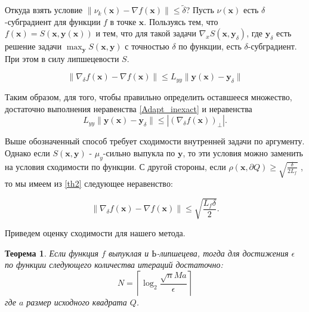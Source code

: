 \documentclass[12pt]{article}
\newtheorem{theorem}{Теорема}[section]
\begin{document}
Откуда взять условие $\|\nu_k(\textbf{x})- \nabla f(\textbf{x})\|\leq \tilde{\delta}$? Пусть $\nu(\textbf{x})$ есть $\delta$-субградиент для функции $f$ в точке $\textbf{x}$. Пользуясь тем, что $f(\textbf{x})=S(\textbf{x}, \textbf{y}(\textbf{x}))$ и тем, что для такой задачи $\nabla_x S(\textbf{x}, \textbf{y}_\delta)$, где $\textbf{y}_\delta$ есть решение задачи $\max_{\textbf{y}}S(\textbf{x}, \textbf{y})$  с точностью $\delta$ по функции, есть $\delta$-субградиент. При этом в силу липшецевости $S$.

$$\|\nabla_\delta f(\textbf{x})- \nabla f(\textbf{x})\|\leq L_{yy} \|\textbf{y}(\textbf{x}) - \textbf{y}_\delta\|$$

Таким образом, для того, чтобы правильно определить оставшееся множество, достаточно выполнения неравенства \ref{Adapt_inexact} и неравенства 
\begin{equation}
    L_{yy} \|\textbf{y}(\textbf{x}) - \textbf{y}_\delta\|\leq |\left(\nabla_\delta f(\textbf{x})\right)_\perp|.
\end{equation}

Выше обозначенный способ требует сходимости внутренней задачи по аргументу. Однако если $S(\textbf{x}, \textbf{y})$ - $\mu_y$-сильно выпукла по $\textbf{y}$, то эти условия можно заменить на условия сходимости по функции. С другой стороны, если $\rho(\textbf{x}, \partial Q)\geq \sqrt{\frac{\delta}{2L_f}}$ , то мы имеем из \ref{th2}  следующее неравенство:

\begin{equation}
\|\nabla_\delta f(\textbf{x}) - \nabla f(\textbf{x})\|\leq \sqrt{\frac{L_f\delta}{2}}.
\end{equation}


Приведем оценку сходимости для нашего метода.

\begin{theorem}
Если функция $f$ выпуклая и $Ь$-липшецева, тогда для достижения $\epsilon$ по функции следующего количества итераций достаточно:
\begin{equation}\label{NI1}N = \left\lceil\log_2\frac{\sqrt{n}Ma}{\epsilon}\right\rceil\end{equation}
где $a$ размер исходного квадрата $Q$.
\end{theorem}
\end{document}
